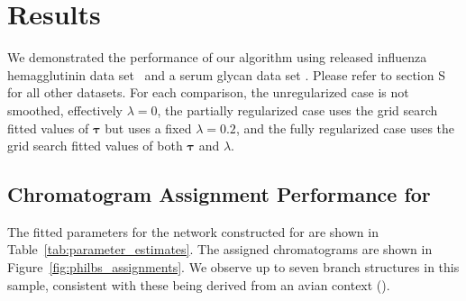 \section{Results}
We demonstrated the performance of our algorithm using released influenza hemagglutinin
data set \philbs \ and a serum glycan data set \rphumanserum. Please refer to section
S for all other datasets. For each comparison, the
unregularized case is not smoothed, effectively $\lambda = 0$, the partially regularized
case uses the grid search fitted values of $\mathbf{\tau}$ but uses a fixed $\lambda = 0.2$,
and the fully regularized case uses the grid search fitted values of both $\mathbf{\tau}$
and $\lambda$.




\subsection{Chromatogram Assignment Performance for \philbs}
    The fitted parameters for the network constructed for \philbs are shown in
    Table~\ref{tab:parameter_estimates}. The assigned chromatograms are shown in
    Figure~\ref{fig:philbs_assignments}. We observe up to seven branch structures in
    this sample, consistent with these \nglycans being derived from an avian context
    (\citealp{Stanley2009,Khatri2016a}).

